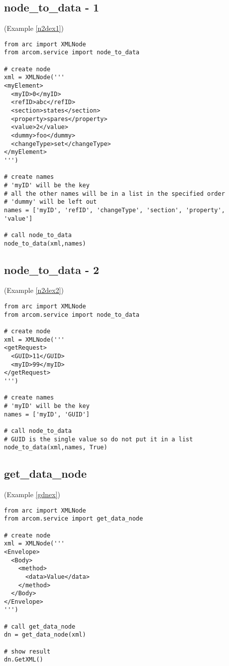 \subsection{node\_to\_data - 1}
(Example \ref{n2dex1})
\label{cn2dex1}
\begin{verbatim}
from arc import XMLNode
from arcom.service import node_to_data

# create node
xml = XMLNode('''
<myElement>
  <myID>0</myID>
  <refID>abc</refID>
  <section>states</section>
  <property>spares</property>
  <value>2</value>
  <dummy>foo</dummy>
  <changeType>set</changeType>
</myElement>
''')

# create names
# 'myID' will be the key
# all the other names will be in a list in the specified order
# 'dummy' will be left out
names = ['myID', 'refID', 'changeType', 'section', 'property', 'value']

# call node_to_data
node_to_data(xml,names)
\end{verbatim}

\subsection{node\_to\_data - 2}
(Example \ref{n2dex2})
\label{cn2dex2}
\begin{verbatim}
from arc import XMLNode
from arcom.service import node_to_data

# create node
xml = XMLNode('''
<getRequest>
  <GUID>11</GUID>
  <myID>99</myID>
</getRequest>
''')

# create names
# 'myID' will be the key
names = ['myID', 'GUID']

# call node_to_data
# GUID is the single value so do not put it in a list
node_to_data(xml,names, True)
\end{verbatim}

\subsection{get\_data\_node}
(Example \ref{gdnex})
\label{cgdnex}
\begin{verbatim}
from arc import XMLNode
from arcom.service import get_data_node

# create node
xml = XMLNode('''
<Envelope>
  <Body>
    <method>
      <data>Value</data>
    </method>
  </Body>
</Envelope>
''')

# call get_data_node
dn = get_data_node(xml)

# show result
dn.GetXML()
\end{verbatim}

